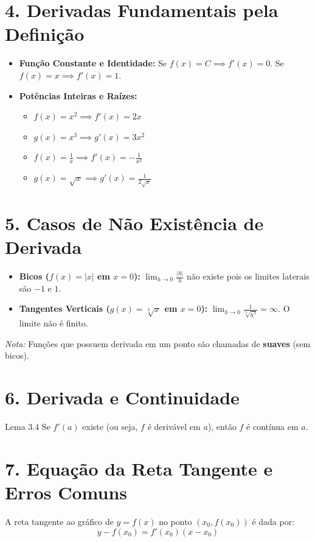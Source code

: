 \documentclass[12pt,a4paper]{article}
\begin{document}
\section*{4. Derivadas Fundamentais pela Definição}
\begin{itemize}
  \item \textbf{Função Constante e Identidade:} Se $f(x) = C \implies f'(x) = 0$. Se $f(x) = x \implies f'(x) = 1$.
  \newpage 

  \item \textbf{Potências Inteiras e Raízes:}
    \begin{itemize}
      \item $f(x) = x^2 \implies f'(x) = 2x$
      \item $g(x) = x^3 \implies g'(x) = 3x^2$
      \item $f(x) = \frac{1}{x} \implies f'(x) = -\frac{1}{x^2}$
      \item $g(x) = \sqrt{x} \implies g'(x) = \frac{1}{2\sqrt{x}}$
    \end{itemize}
\end{itemize}

\section*{5. Casos de Não Existência de Derivada}
\begin{itemize}
  \item \textbf{Bicos ($f(x) = |x|$ em $x=0$):} $\lim_{h \to 0} \frac{|h|}{h}$ não existe pois os limites laterais são $-1$ e $1$.
  \item \textbf{Tangentes Verticais ($g(x) = \sqrt[3]{x}$ em $x=0$):} $\lim_{h \to 0} \frac{1}{\sqrt[3]{h^2}} = \infty$. O limite não é finito.
\end{itemize}
\textit{Nota:} Funções que possuem derivada em um ponto são chamadas de \textbf{suaves} (sem bicos).

\section*{6. Derivada e Continuidade}
\begin{definicao}{Lema 3.4}
Se $f'(a)$ existe (ou seja, $f$ é derivável em $a$), então $f$ é contínua em $a$.
\end{definicao}

\section*{7. Equação da Reta Tangente e Erros Comuns}
A reta tangente ao gráfico de $y = f(x)$ no ponto $(x_0, f(x_0))$ é dada por:
\[ y - f(x_0) = f'(x_0)(x - x_0) \]
\end{document}
